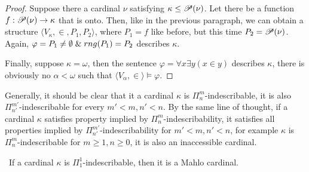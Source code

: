 \begin{proof}
Suppose there a cardinal $\nu$ satisfying $\kappa \leq \mathscr{P} (\nu)$. Let there be a function $f: \mathscr{P} (\nu) \rightarrow \kappa$ that is onto. Then, like in the previous paragraph, we can obtain a structure $\langle V_\kappa, \in, P_1, P_2 \rangle$, where $P_1 = f$ like before, but this time $P_2 = \mathscr{P} (\nu)$. Again, $\varphi = P_1 \neq \emptyset \mathrel{\&} rng(P_1) = P_2$ describes $\kappa$.

Finally, suppose $\kappa = \omega$, then the sentence $\varphi = \forall x \exists y (x \in y)$ describes $\kappa$, there is obviously no $\alpha < \omega$ such that $\langle V_\alpha, \in \rangle \models \varphi$.

\end{proof}

Generally, it should be clear that it a cardinal $\kappa$ is $\Pi^m_n$-indescribable, it is also $\Pi^{m'}_{n'}$-indescribable for every $m'<m, n'<n$. By the same line of thought, if a cardinal $\kappa$ satisfies property implied by $\Pi^m_n$-indescribability, it satisfies all properties implied by $\Pi^{m'}_{n'}$-indescribability for $m'<m, n'<n$, for example $\kappa$ is $\Pi^m_n$-indescribable for $m \geq 1, n \geq 0$, it is also an inaccessible cardinal.


\begin{theorem}\
If a cardinal $\kappa$ is $\Pi^1_1$-indescribable, then it is a Mahlo cardinal.
\end{theorem}

